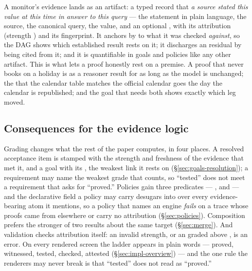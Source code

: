 A monitor's evidence lands as an \textbf{} artifact: a typed record that \emph{a source
stated this value at this time in answer to this query} --- the statement in plain language, the source, the
canonical query, the value,  and an optional , with its attribution
(strength ) and its fingerprint. It anchors by  to what it was checked
\emph{against}, so the DAG shows which established result rests on it; it discharges an 
residual by being cited from it; and it is quantifiable in goals and policies like any other artifact. This
is what lets a proof honestly rest on a premise. A proof that  never books on a holiday is
 as a reasoner result for as long as the model is unchanged; the  that the
calendar table matches the official calendar goes  the day the calendar is republished; and the
goal that needs both shows exactly which leg moved.

\subsection{Consequences for the evidence logic}\label{sec:oracles-consequences}

Grading changes what the rest of the paper computes, in four places. A resolved acceptance item is stamped
with the strength and freshness of the evidence that met it, and a goal with its , the
weakest link it rests on (\S\ref{sec:goals-resolution}); a requirement may name the weakest grade that
counts, so ``tested'' does not meet a requirement that asks for ``proved.'' Policies gain three predicates
--- ,  and  --- and the declarative
 field a policy may carry desugars into  over every evidence-bearing atom
it mentions, so a policy that names an engine \emph{fails} on a trace whose proofs came from elsewhere or
carry no attribution (\S\ref{sec:policies}). Composition prefers the stronger of two results about the same
target (\S\ref{sec:merge}). And validation checks attribution itself: an invalid strength, or an
 graded above , is an error. On every rendered screen the ladder appears in
plain words --- proved, witnessed, tested, checked, attested (\S\ref{sec:impl-overview}) --- and the one rule
the renderers may never break is that ``tested'' does not read as ``proved.''
